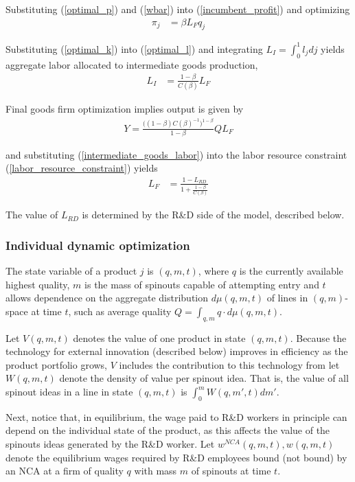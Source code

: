\documentclass[11pt,english]{article}
\theoremstyle{remark}
\begin{document}
Substituting (\ref{optimal_p}) and (\ref{wbar}) into (\ref{incumbent_profit}) and optimizing
\begin{align}
\pi_j &= \beta L_F q_j \label{profits_eq}
\end{align}

Substituting (\ref{optimal_k}) into (\ref{optimal_l}) and integrating $L_I = \int_0^1 l_j dj$ yields aggregate labor allocated to intermediate goods production,
\begin{align}
	L_I &= \frac{1-\beta}{C(\beta)}L_F \label{intermediate_goods_labor}
\end{align}

Final goods firm optimization implies output is given by 
\begin{align}
	Y = \frac{\Big((1-\beta)C(\beta)^{-1}\Big)^{1-\beta}}{1-\beta} Q L_F
\end{align}

and substituting (\ref{intermediate_goods_labor}) into the labor resource constraint (\ref{labor_resource_constraint}) yields
\begin{align}
	L_F &= \frac{1 - L_{RD}}{1 + \frac{1-\beta}{C(\beta)}}
\end{align}

The value of $L_{RD}$ is determined by the R\&D side of the model, described below.

\subsubsection{Individual dynamic optimization}

The state variable of a product $j$ is $(q,m,t)$, where $q$ is the currently available highest quality, $m$ is the mass of spinouts capable of attempting entry and $t$ allows dependence on the aggregate distribution $d\mu(q,m,t)$ of lines in $(q,m)$-space at time $t$, such as average quality $Q = \int_{q,m} q  \cdot d\mu(q,m,t)$. 

Let $V(q,m,t)$ denotes the value of one product in state $(q,m,t)$. Because the technology for external innovation (described below) improves in efficiency as the product portfolio grows, $V$ includes the contribution to this technology from  let $W(q,m,t)$ denote the density of value per spinout idea. That is, the value of all spinout ideas in a line in state $(q,m,t)$ is $\int_0^m W(q,m',t) dm'$. 

Next, notice that, in equilibrium, the wage paid to R\&D workers in principle can depend on the individual state of the product, as this affects the value of the spinouts ideas generated by the R\&D worker. Let $w^{NCA}(q,m,t),w(q,m,t)$ denote the equilibrium wages required by R\&D employees bound (not bound) by an NCA at a firm of quality $q$ with mass $m$ of spinouts at time $t$.
\end{document}

